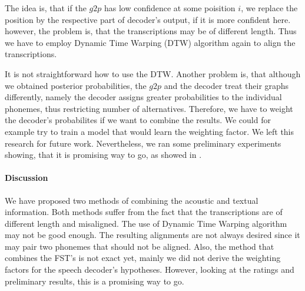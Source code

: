 \par
The idea is, that if the $g2p$ has low confidence at some poisition $i$, we replace the position by the respective part of decoder's output, if it is more confident here.
however, the problem is, that the transcriptions may be of different length.
Thus we have to employ Dynamic Time Warping (DTW) algorithm again to align the transcriptions.
\par
It is not straightforward how to use the DTW.
Another problem is, that although we obtained posterior probabilities, the $g2p$ and the decoder treat their graphs differently, namely the decoder assigns greater probabilities to the individual phonemes, thus restricting number of alternatives.
Therefore, we have to weight the decoder's probabilites if we want to combine the results.
We could for example try to train a model that would learn the weighting factor.
We left this research for future work.
Nevertheless, we ran some preliminary experiments showing, that it is promising way to go, as showed in .
\paragraph{Discussion}
We have proposed two methods of combining the acoustic and textual information.
Both methods suffer from the fact that the transcriptions are of different length and misaligned.
The use of Dynamic Time Warping algorithm may not be good enough.
The resulting alignments are not always desired since it may pair two phonemes that should not be aligned.
Also, the method that combines the FST's is not exact yet, mainly we did not derive the weighting factors for the speech decoder's hypotheses.
However, looking at the ratings and preliminary results, this is a promising way to go.